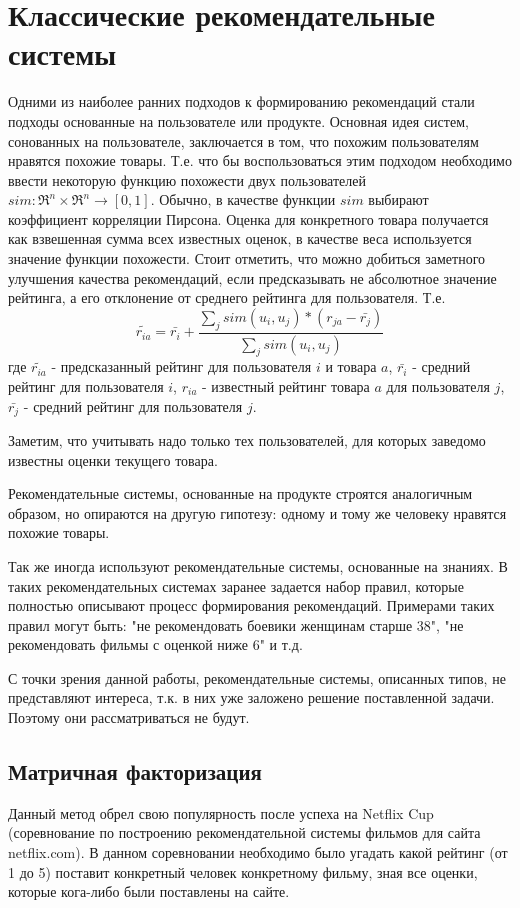 \documentclass[12pt,a4paper]{report}
\begin{document}
\section{Классические рекомендательные системы}
Одними из наиболее ранних подходов к формированию рекомендаций стали подходы основанные на пользователе или продукте. Основная идея систем, сонованных на пользователе, заключается в том, что похожим пользователям нравятся похожие товары.
Т.е. что бы воспользоваться этим подходом необходимо ввести некоторую функцию похожести двух пользователей $sim: \mathfrak{R}^n \times \mathfrak{R}^n \to [0,1]$. Обычно, в качестве функции $sim$ выбирают коэффициент корреляции Пирсона. Оценка для конкретного товара получается как взвешенная сумма всех известных оценок, в качестве веса используется значение функции похожести. Стоит отметить, что можно добиться заметного улучшения качества рекомендаций, если предсказывать не абсолютное значение рейтинга, а его отклонение от среднего рейтинга для пользователя. Т.е. 
\begin{equation*}
\tilde{r_{ia}} = \bar{r_i} + \frac{\sum_{j} sim(u_i, u_j) * (r_{ja} - \bar{r_j})}{\sum_{j} sim(u_i, u_j)}
\end{equation*}
где $\tilde{r_{ia}}$ - предсказанный рейтинг для пользователя $i$ и товара $a$, $\bar{r_i}$ - средний рейтинг для пользователя $i$, $r_{ia}$ - известный рейтинг товара $a$ для пользователя $j$, $\bar{r_j}$ - средний рейтинг для пользователя $j$.

Заметим, что учитывать надо только тех пользователей, для которых заведомо известны оценки текущего товара.

Рекомендательные системы, основанные на продукте строятся аналогичным образом, но опираются на другую гипотезу: одному и тому же человеку нравятся похожие товары.

Так же иногда используют рекомендательные системы, основанные на знаниях. В таких рекомендательных системах заранее задается набор правил, которые полностью описывают процесс формирования рекомендаций. Примерами таких правил могут быть: "не рекомендовать боевики женщинам старше 38", "не рекомендовать фильмы с оценкой ниже 6" и т.д.

С точки зрения данной работы, рекомендательные системы, описанных типов, не представляют интереса, т.к. в них уже заложено решение поставленной задачи. Поэтому они рассматриваться не будут.

\subsection{Матричная факторизация}
Данный метод обрел свою популярность после успеха на Netflix Cup (соревнование по построению рекомендательной системы фильмов для сайта netflix.com). В данном соревновании необходимо было угадать какой рейтинг (от 1 до 5) поставит конкретный человек конкретному фильму, зная все оценки, которые кога-либо были поставлены на сайте.
\end{document}
